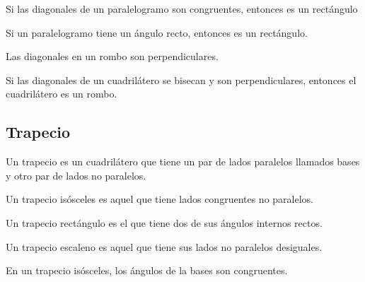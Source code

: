 \begin{theorem}
    Si las diagonales de un paralelogramo son congruentes, entonces es un rectángulo
\end{theorem}

\begin{theorem}
    Si un paralelogramo tiene un ángulo recto, entonces es un rectángulo.
\end{theorem}

\begin{theorem}
    Las diagonales en un rombo son perpendiculares.
\end{theorem}

\clearpage

\begin{theorem}
    Si las diagonales de un cuadrilátero se bisecan y son perpendiculares, entonces el cuadrilátero es un rombo.

    \begin{figure}[!h]
        \centering
        
        \label{fig:theorem15}
    \end{figure}
    
\end{theorem}

\subsection{Trapecio}

\begin{definition}
    Un trapecio es un cuadrilátero que tiene un par de lados paralelos llamados bases y otro par de lados no paralelos.
\end{definition}

\begin{definition}
    Un trapecio isósceles es aquel que tiene lados congruentes no paralelos.
\end{definition}

\begin{definition}
    Un trapecio rectángulo es el que tiene dos de sus ángulos internos rectos.    
\end{definition}

\begin{definition}
    Un trapecio escaleno es aquel que tiene sus lados no paralelos desiguales.
\end{definition}

\begin{theorem}
    En un trapecio isósceles, los ángulos de la bases son congruentes.

    \begin{figure}[!h]
        \centering
        
        \label{fig:theorem16}
    \end{figure}
    
\end{theorem}

